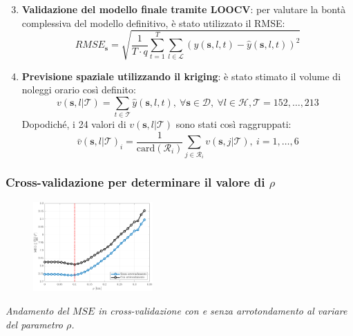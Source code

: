\begin{frame}
	\centering
	
	\begin{enumerate}
		\setcounter{enumi}{2}
		\justifying
		\item \textbf{Validazione del modello finale tramite LOOCV}: per valutare la bontà complessiva del modello definitivo, è stato utilizzato il RMSE:
		\begin{equation*}
			RMSE_\mathbf{s} = \sqrt{\frac{1}{T\cdot q}\sum_{t=1}^{T}\sum_{l\in\mathcal{L}}^{} (y(\mathbf{s}, l, t) - \hat{y}(\mathbf{s}, l, t))^2}
		\end{equation*}
		\item \textbf{Previsione spaziale utilizzando il kriging}: è stato stimato il volume di noleggi orario così definito:
		\begin{equation*}
			v(\mathbf{s}, l|\mathcal{T}) = \sum_{t\in\mathcal{T}} \hat{y}(\mathbf{s}, l, t), \ \forall \mathbf{s}\in\mathcal{D}, \ \forall l\in\mathcal{H}, \mathcal{T} = 152,\dots,213
		\end{equation*}
			Dopodiché, i \num{24} valori di $v(\mathbf{s}, l|\mathcal{T})$ sono stati così raggruppati:
		\begin{equation*}
			\bar{v}(\mathbf{s}, l|\mathcal{T})_i = \frac{1}{\text{card}(\mathcal{R}_i)}\sum_{j\in\mathcal{R}_i}^{}v(\mathbf{s}, j|\mathcal{T}), \ i=1,\dots, 6
		\end{equation*}
	\end{enumerate}	
\end{frame}

\begin{frame}
	\frametitle{Cross-validazione per determinare il valore di $\rho$}
	\centering
	\begin{figure}
		\includegraphics[height=130px]{../Tesi/Immagini/4. Caso di studio/Cross_validazione/MSE_rho_full_focus}
	\end{figure}
	\vspace{-10pt}
	\textit{Andamento del $MSE$ in cross-validazione con e senza arrotondamento al variare del parametro $\rho$.}
\end{frame}

